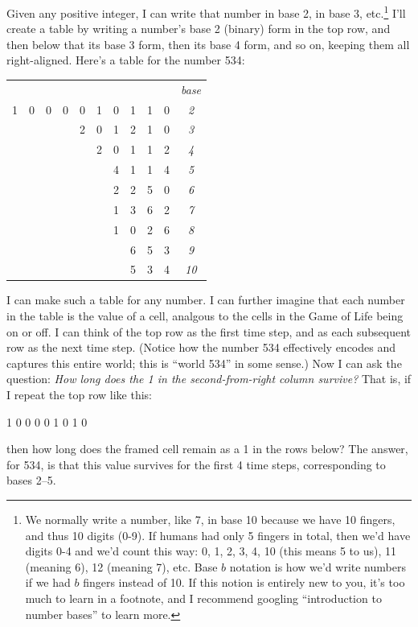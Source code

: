 \documentclass[9pt, twoside]{book}
\theoremstyle{argtstyle}
\begin{document}
Given any positive integer, I can write that number in base 2, in base 3,
etc.\footnote{We normally write a number, like 7, in base 10 because we have 10
fingers, and thus 10 digits (0-9). If humans had only 5 fingers in total, then
we'd have
digits 0-4 and we'd count this way: 0, 1, 2, 3, 4, 10 (this means 5 to us), 11
(meaning 6), 12 (meaning 7), etc. Base $b$ notation is how we'd write numbers if
we had $b$ fingers instead of 10. If this notion is entirely new to you, it's
too much to learn in a footnote, and I recommend googling ``introduction to
number bases'' to learn more.}
I'll create a table by writing a number's base 2 (binary)
form in the top row,
and then below that its base 3 form, then its base 4 form, and so on, keeping
them all right-aligned. Here's a table for the number 534:

\begin{center}
\begin{tabular}{cccccccccc|c}
  &   &   &   &   &   &   &   &   &   &\em base \\
1 & 0 & 0 & 0 & 0 & 1 & 0 & 1 & 1 & 0 & \it 2 \\
  &   &   &   & 2 & 0 & 1 & 2 & 1 & 0 & \it 3 \\
  &   &   &   &   & 2 & 0 & 1 & 1 & 2 & \it 4 \\
  &   &   &   &   &   & 4 & 1 & 1 & 4 & \it 5 \\
  &   &   &   &   &   & 2 & 2 & 5 & 0 & \it 6 \\
  &   &   &   &   &   & 1 & 3 & 6 & 2 & \it 7 \\
  &   &   &   &   &   & 1 & 0 & 2 & 6 & \it 8 \\
  &   &   &   &   &   &   & 6 & 5 & 3 & \it 9 \\
  &   &   &   &   &   &   & 5 & 3 & 4 & \it 10 \\
\end{tabular}
\end{center}

I can make such a table for any number.
I can further imagine that each number in the table is the value of a cell,
analgous to the cells in the Game of Life being on or off.
I can think of the
top row as the first time step, and as each subsequent row as the next time
step.
(Notice how the number 534 effectively encodes and captures this entire
world; this is ``world 534'' in some sense.)
Now I can ask the question:
{\em How long does the 1 in the second-from-right column survive?}
That is, if I repeat the top row like this:
\begin{center}
    1 0 0 0 0 1 0 1  0
\end{center}
then how long does the framed cell
remain as a 1 in the rows below?
The answer, for 534, is that this value survives for the first 4
time steps, corresponding to bases 2--5.
\end{document}
